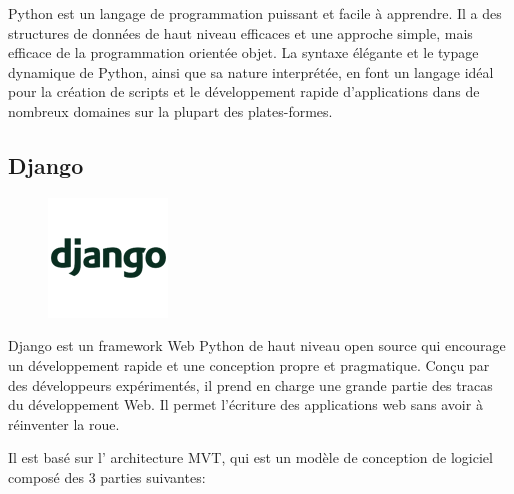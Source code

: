 Python est un langage de programmation puissant et facile à apprendre. Il a des 
structures de données de haut niveau efficaces et une approche simple, mais 
efficace de la programmation orientée objet. La syntaxe élégante et le typage 
dynamique de Python, ainsi que sa nature interprétée, en font un langage idéal 
pour la création de scripts et le développement rapide d’applications dans de 
nombreux domaines sur la plupart des plates-formes\cite{17}.

\subsection{Django}
\begin{figure}
    \vspace{-22pt}
    \begin{center}
        \includegraphics[scale=0.5]{images/logo/django.png}
        \label{fig75}
    \end{center}
    \vspace{-20pt}
    \vspace{-10pt}
\end{figure}

Django est un framework Web Python de haut niveau open source qui encourage un
développement rapide et une conception propre et pragmatique. Conçu par des
développeurs expérimentés, il prend en charge une grande partie des tracas du
développement Web. Il permet l'écriture des applications web sans avoir à
réinventer la roue\cite{18}.

Il est basé sur l' architecture MVT, qui est un modèle de conception de logiciel 
composé des 3 parties suivantes:

